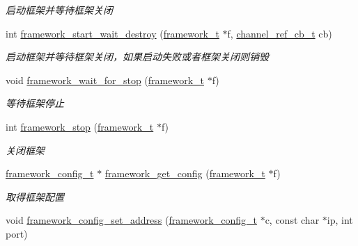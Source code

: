 \begin{DoxyCompactItemize}
\begin{DoxyCompactList}\small\item\em 启动框架并等待框架关闭 \end{DoxyCompactList}\item 
int \hyperlink{a00093_ga0593beee9da9b0858ad53c4f81671622_ga0593beee9da9b0858ad53c4f81671622}{framework\+\_\+start\+\_\+wait\+\_\+destroy} (\hyperlink{a00047_a6149d769f6f07ed14a40a271c95d8463_a6149d769f6f07ed14a40a271c95d8463}{framework\+\_\+t} $\ast$f, \hyperlink{a00047_ae296ec4d1ce108960de8dcc423956a1d_ae296ec4d1ce108960de8dcc423956a1d}{channel\+\_\+ref\+\_\+cb\+\_\+t} cb)
\begin{DoxyCompactList}\small\item\em 启动框架并等待框架关闭，如果启动失败或者框架关闭则销毁 \end{DoxyCompactList}\item 
void \hyperlink{a00093_gaefec7da1b548ddb97c73c8924ba17069_gaefec7da1b548ddb97c73c8924ba17069}{framework\+\_\+wait\+\_\+for\+\_\+stop} (\hyperlink{a00047_a6149d769f6f07ed14a40a271c95d8463_a6149d769f6f07ed14a40a271c95d8463}{framework\+\_\+t} $\ast$f)
\begin{DoxyCompactList}\small\item\em 等待框架停止 \end{DoxyCompactList}\item 
int \hyperlink{a00093_ga429be76d09278d6170f1b519f4dbb689_ga429be76d09278d6170f1b519f4dbb689}{framework\+\_\+stop} (\hyperlink{a00047_a6149d769f6f07ed14a40a271c95d8463_a6149d769f6f07ed14a40a271c95d8463}{framework\+\_\+t} $\ast$f)
\begin{DoxyCompactList}\small\item\em 关闭框架 \end{DoxyCompactList}\item 
\hyperlink{a00047_a55b26efa9e6ee05514d087ba2593a54b_a55b26efa9e6ee05514d087ba2593a54b}{framework\+\_\+config\+\_\+t} $\ast$ \hyperlink{a00093_gaf0524cc257c8e57ba11d676dcca6bf64_gaf0524cc257c8e57ba11d676dcca6bf64}{framework\+\_\+get\+\_\+config} (\hyperlink{a00047_a6149d769f6f07ed14a40a271c95d8463_a6149d769f6f07ed14a40a271c95d8463}{framework\+\_\+t} $\ast$f)
\begin{DoxyCompactList}\small\item\em 取得框架配置 \end{DoxyCompactList}\item 
void \hyperlink{a00093_ga63620720efce87c837a3f069f626f6b1_ga63620720efce87c837a3f069f626f6b1}{framework\+\_\+config\+\_\+set\+\_\+address} (\hyperlink{a00047_a55b26efa9e6ee05514d087ba2593a54b_a55b26efa9e6ee05514d087ba2593a54b}{framework\+\_\+config\+\_\+t} $\ast$c, const char $\ast$ip, int port)

\end{DoxyCompactItemize}
